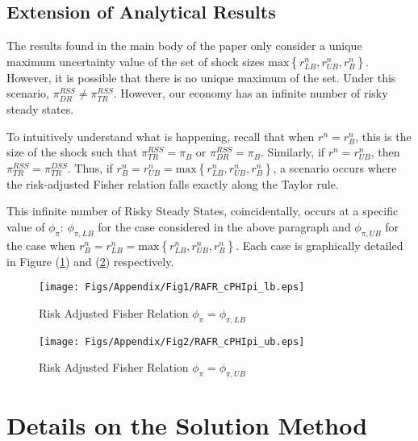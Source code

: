 \documentclass[11pt]{article}
\begin{document}
\begin{singlespace}
		\subsection{Extension of Analytical Results}
		
		The results found in the main body of the paper only consider a unique maximum uncertainty value of the set of shock sizes $\text{max}\left\{r^n_{LB}, r^n_{UB}, r^n_{B}\right\}$. However, it is possible that there is no unique maximum of the set. Under this scenario, $\pi_{DR}^{RSS} \ne \pi_{TR}^{RSS}$. However, our economy has an infinite number of risky steady states. 
		
		To intuitively understand what is happening, recall that when $r^n = r^n_{B}$, this is the size of the shock such that $\pi_{TR}^{RSS} = \pi_B$ or  $\pi_{DR}^{RSS} = \pi_B$. Similarly, if $r^n = r^n_{UB}$, then $\pi_{TR}^{RSS} = \pi_{TR}^{DSS}$. Thus, if $r^n_{B} = r^n_{UB} = \text{max}\left\{r^n_{LB}, r^n_{UB}, r^n_{B}\right\}$, a scenario occurs where the risk-adjusted Fisher relation falls exactly along the Taylor rule. 
		
		This infinite number of Risky Steady States, coincidentally, occurs at a specific value of $\phi_{\pi}$: $\phi_{\pi, LB}$ for the case considered in the above paragraph and $\phi_{\pi,UB}$ for the case when  $r^n_{B} = r^n_{LB} = \text{max}\left\{r^n_{LB}, r^n_{UB}, r^n_{B}\right\}$. Each case is graphically detailed in Figure (\ref{fig:cPHIpilb}) and (\ref{fig:cPHIpiub}) respectively. 
		
		\begin{figure}[!ht]
			\begin{center}
				\caption{Risk Adjusted Fisher Relation $\phi_{\pi} = \phi_{\pi,LB}$}
				\texttt{[image: Figs/Appendix/Fig1/RAFR\_cPHIpi\_lb.eps]}\label{fig:cPHIpilb}
			\end{center}
		\end{figure}
		
		\begin{figure}[!ht]
			\begin{center}
				\caption{Risk Adjusted Fisher Relation $\phi_{\pi} = \phi_{\pi,UB}$}
				\texttt{[image: Figs/Appendix/Fig2/RAFR\_cPHIpi\_ub.eps]}\label{fig:cPHIpiub}
			\end{center}
		\end{figure}
		
		
		\section{Details on the Solution Method}
		\label{A:SolutionMethod}
		\setcounter{equation}{0}

\end{singlespace}
\end{document}
